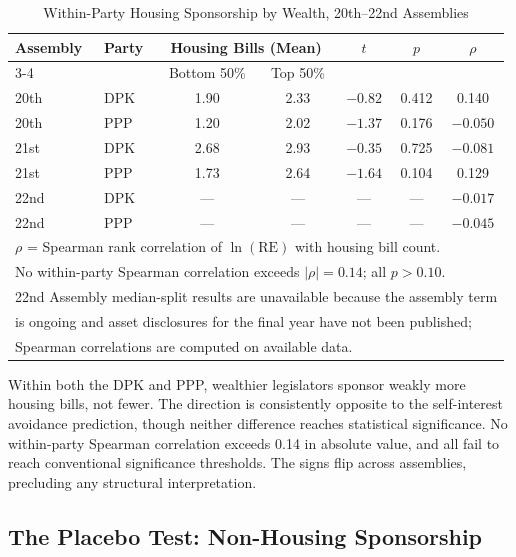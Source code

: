 \documentclass[11pt]{article}
\begin{document}
\begin{table}[htbp]
\centering
\caption{Within-Party Housing Sponsorship by Wealth, 20th--22nd Assemblies}
\label{tab:within}
\begin{tabular}{llccccc}
\toprule
Assembly & Party & \multicolumn{2}{c}{Housing Bills (Mean)} & $t$ & $p$ & $\rho$ \\
\cmidrule(lr){3-4}
& & Bottom 50\% & Top 50\% & & & \\
\midrule
20th & DPK  & 1.90 & 2.33 & $-0.82$ & 0.412 & 0.140 \\
20th & PPP  & 1.20 & 2.02 & $-1.37$ & 0.176 & $-0.050$ \\
21st & DPK  & 2.68 & 2.93 & $-0.35$ & 0.725 & $-0.081$ \\
21st & PPP  & 1.73 & 2.64 & $-1.64$ & 0.104 & 0.129 \\
22nd & DPK  & --- & --- & --- & --- & $-0.017$ \\
22nd & PPP  & --- & --- & --- & --- & $-0.045$ \\
\bottomrule
\multicolumn{7}{l}{\footnotesize $\rho$ = Spearman rank correlation of $\ln(\text{RE})$ with housing bill count.} \\
\multicolumn{7}{l}{\footnotesize No within-party Spearman correlation exceeds $|\rho| = 0.14$; all $p > 0.10$.} \\
\multicolumn{7}{l}{\footnotesize 22nd Assembly median-split results are unavailable because the assembly term} \\
\multicolumn{7}{l}{\footnotesize is ongoing and asset disclosures for the final year have not been published;} \\
\multicolumn{7}{l}{\footnotesize Spearman correlations are computed on available data.} \\
\end{tabular}
\end{table}

Within both the DPK and PPP, wealthier legislators sponsor weakly more housing bills, not fewer. The direction is consistently opposite to the self-interest avoidance prediction, though neither difference reaches statistical significance. No within-party Spearman correlation exceeds 0.14 in absolute value, and all fail to reach conventional significance thresholds. The signs flip across assemblies, precluding any structural interpretation.

\subsection{The Placebo Test: Non-Housing Sponsorship}
\end{document}
